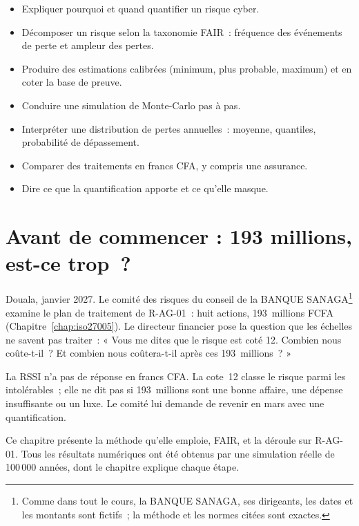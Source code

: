 \begin{boxobjectifs}
\begin{itemize}
    \item Expliquer pourquoi et quand quantifier un risque cyber.
    \item Décomposer un risque selon la taxonomie FAIR~: fréquence des
          événements de perte et ampleur des pertes.
    \item Produire des estimations calibrées (minimum, plus probable,
          maximum) et en coter la base de preuve.
    \item Conduire une simulation de Monte-Carlo pas à pas.
    \item Interpréter une distribution de pertes annuelles~: moyenne,
          quantiles, probabilité de dépassement.
    \item Comparer des traitements en francs CFA, y compris une assurance.
    \item Dire ce que la quantification apporte et ce qu'elle masque.
\end{itemize}
\end{boxobjectifs}

\bigskip

\section*{Avant de commencer : 193 millions, est-ce trop~?}

Douala, janvier 2027. Le comité des risques du conseil de la BANQUE
SANAGA\footnote{Comme dans tout le cours, la BANQUE SANAGA, ses
dirigeants, les dates et les montants sont fictifs~; la méthode et les
normes citées sont exactes.} examine le plan de traitement de R-AG-01~:
huit actions, 193~millions FCFA (Chapitre~\ref{chap:iso27005}). Le
directeur financier pose la question que les échelles ne savent pas
traiter~: « Vous me dites que le risque est coté 12. Combien nous
coûte-t-il~? Et combien nous coûtera-t-il après ces 193~millions~? »

La RSSI n'a pas de réponse en francs CFA. La cote~12 classe le risque
parmi les intolérables~; elle ne dit pas si 193~millions sont une bonne
affaire, une dépense insuffisante ou un luxe. Le comité lui demande de
revenir en mars avec une quantification.

\medskip

Ce chapitre présente la méthode qu'elle emploie, FAIR, et la déroule sur
R-AG-01. Tous les résultats numériques ont été obtenus par une simulation
réelle de 100\,000 années, dont le chapitre explique chaque étape.

